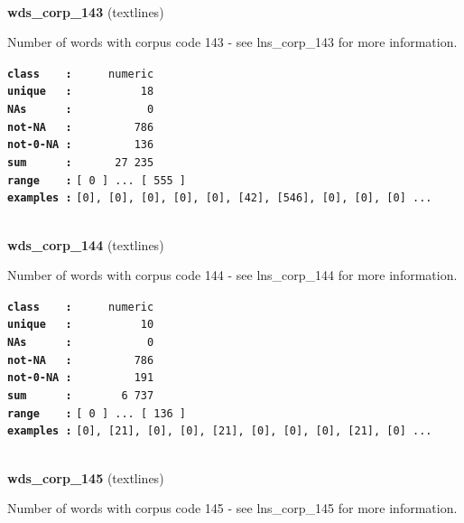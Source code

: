 \documentclass[]{article}
\begin{document}
~

\textbf{wds\_corp\_143} (textlines)

Number of words with corpus code 143 - see lns\_corp\_143 for more
information.

\textbf{\texttt{class\ \ \ \ :}} \texttt{~~~~~numeric}\\
\textbf{\texttt{unique\ \ \ :}} \texttt{~~~~~~~~~~18}\\
\textbf{\texttt{NAs\ \ \ \ \ \ :}} \texttt{~~~~~~~~~~~0}\\
\textbf{\texttt{not-NA\ \ \ :}} \texttt{~~~~~~~~~786}\\
\textbf{\texttt{not-0-NA\ :}} \texttt{~~~~~~~~~136}\\
\textbf{\texttt{sum\ \ \ \ \ \ :}} \texttt{~~~~~~27~235}\\
\textbf{\texttt{range\ \ \ \ :}}
\texttt{{[}\ 0\ {]}\ ...\ {[}\ 555\ {]}}\\
\textbf{\texttt{examples\ :}}
\texttt{{[}0{]},\ {[}0{]},\ {[}0{]},\ {[}0{]},\ {[}0{]},\ {[}42{]},\ {[}546{]},\ {[}0{]},\ {[}0{]},\ {[}0{]}\ ...}\\

~

\textbf{wds\_corp\_144} (textlines)

Number of words with corpus code 144 - see lns\_corp\_144 for more
information.

\textbf{\texttt{class\ \ \ \ :}} \texttt{~~~~~numeric}\\
\textbf{\texttt{unique\ \ \ :}} \texttt{~~~~~~~~~~10}\\
\textbf{\texttt{NAs\ \ \ \ \ \ :}} \texttt{~~~~~~~~~~~0}\\
\textbf{\texttt{not-NA\ \ \ :}} \texttt{~~~~~~~~~786}\\
\textbf{\texttt{not-0-NA\ :}} \texttt{~~~~~~~~~191}\\
\textbf{\texttt{sum\ \ \ \ \ \ :}} \texttt{~~~~~~~6~737}\\
\textbf{\texttt{range\ \ \ \ :}}
\texttt{{[}\ 0\ {]}\ ...\ {[}\ 136\ {]}}\\
\textbf{\texttt{examples\ :}}
\texttt{{[}0{]},\ {[}21{]},\ {[}0{]},\ {[}0{]},\ {[}21{]},\ {[}0{]},\ {[}0{]},\ {[}0{]},\ {[}21{]},\ {[}0{]}\ ...}\\

~

\textbf{wds\_corp\_145} (textlines)

Number of words with corpus code 145 - see lns\_corp\_145 for more
information.
\end{document}
